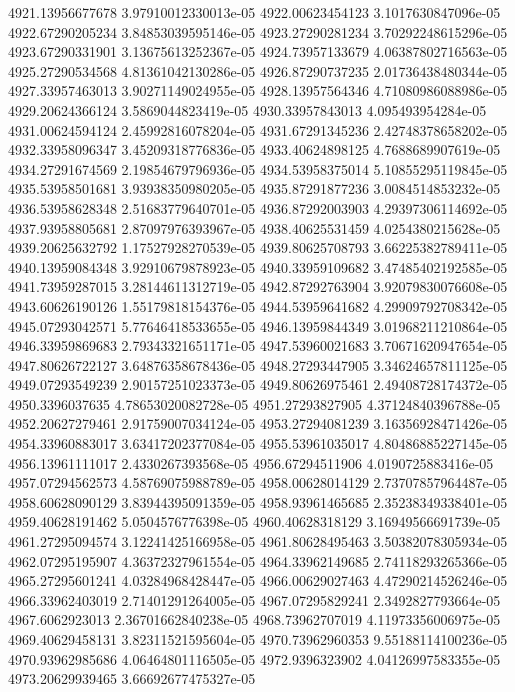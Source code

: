{4921.13956677678 3.97910012330013e-05
4922.00623454123 3.1017630847096e-05
4922.67290205234 3.84853039595146e-05
4923.27290281234 3.70292248615296e-05
4923.67290331901 3.13675613252367e-05
4924.73957133679 4.06387802716563e-05
4925.27290534568 4.81361042130286e-05
4926.87290737235 2.01736438480344e-05
4927.33957463013 3.90271149024955e-05
4928.13957564346 4.71080986088986e-05
4929.20624366124 3.5869044823419e-05
4930.33957843013 4.095493954284e-05
4931.00624594124 2.45992816078204e-05
4931.67291345236 2.42748378658202e-05
4932.33958096347 3.45209318776836e-05
4933.40624898125 4.7688689907619e-05
4934.27291674569 2.19854679796936e-05
4934.53958375014 5.10855295119845e-05
4935.53958501681 3.93938350980205e-05
4935.87291877236 3.0084514853232e-05
4936.53958628348 2.51683779640701e-05
4936.87292003903 4.29397306114692e-05
4937.93958805681 2.87097976393967e-05
4938.40625531459 4.0254380215628e-05
4939.20625632792 1.17527928270539e-05
4939.80625708793 3.66225382789411e-05
4940.13959084348 3.92910679878923e-05
4940.33959109682 3.47485402192585e-05
4941.73959287015 3.28144611312719e-05
4942.87292763904 3.92079830076608e-05
4943.60626190126 1.55179818154376e-05
4944.53959641682 4.29909792708342e-05
4945.07293042571 5.77646418533655e-05
4946.13959844349 3.01968211210864e-05
4946.33959869683 2.79343321651171e-05
4947.53960021683 3.70671620947654e-05
4947.80626722127 3.64876358678436e-05
4948.27293447905 3.34624657811125e-05
4949.07293549239 2.90157251023373e-05
4949.80626975461 2.49408728174372e-05
4950.3396037635 4.78653020082728e-05
4951.27293827905 4.37124840396788e-05
4952.20627279461 2.91759007034124e-05
4953.27294081239 3.16356928471426e-05
4954.33960883017 3.63417202377084e-05
4955.53961035017 4.80486885227145e-05
4956.13961111017 2.4330267393568e-05
4956.67294511906 4.0190725883416e-05
4957.07294562573 4.58769075988789e-05
4958.00628014129 2.73707857964487e-05
4958.60628090129 3.83944395091359e-05
4958.93961465685 2.35238349338401e-05
4959.40628191462 5.0504576776398e-05
4960.40628318129 3.16949566691739e-05
4961.27295094574 3.12241425166958e-05
4961.80628495463 3.50382078305934e-05
4962.07295195907 4.36372327961554e-05
4964.33962149685 2.74118293265366e-05
4965.27295601241 4.03284968428447e-05
4966.00629027463 4.47290214526246e-05
4966.33962403019 2.71401291264005e-05
4967.07295829241 2.3492827793664e-05
4967.6062923013 2.36701662840238e-05
4968.73962707019 4.11973356006975e-05
4969.40629458131 3.82311521595604e-05
4970.73962960353 9.55188114100236e-05
4970.93962985686 4.06464801116505e-05
4972.9396323902 4.04126997583355e-05
4973.20629939465 3.66692677475327e-05
}
